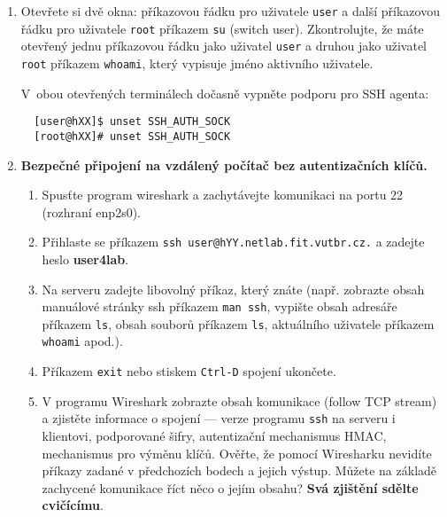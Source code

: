 \documentclass[a4paper,11pt]{article}
\begin{document}
\begin{enumerate}

  \item Otevřete si dvě okna: příkazovou řádku pro uživatele {\tt user} a další
    příkazovou řádku pro uživatele {\tt root} příkazem {\tt su} (switch user).
Zkontrolujte, že máte otevřený jednu příkazovou řádku jako uživatel
{\tt user} a druhou jako uživatel {\tt root} příkazem {\tt whoami}, který vypisuje jméno aktivního
uživatele.

    V~obou otevřených terminálech dočasně vypněte podporu pro SSH agenta:
  \begin{lstlisting}
  [user@hXX]$ unset SSH_AUTH_SOCK
  [root@hXX]# unset SSH_AUTH_SOCK
  \end{lstlisting}

  \item {\bf Bezpečné připojení na vzdálený počítač bez autentizačních klíčů.}

    \begin{enumerate}

      \item Spusťte program wireshark a zachytávejte komunikaci na portu 22
        (rozhraní enp2s0).

      \item Přihlaste se příkazem {\tt ssh user@hYY.netlab.fit.vutbr.cz.} a zadejte heslo \textbf{user4lab}.

      \item Na serveru zadejte libovolný příkaz, který znáte (např. zobrazte
        obsah manuálové stránky ssh příkazem {\tt man ssh}, vypište
        obsah adresáře příkazem {\tt ls}, obsah souborů příkazem {\tt ls},
        aktuálního uživatele příkazem {\tt whoami} apod.).

      \item Příkazem {\tt exit} nebo stiskem {\tt Ctrl-D} spojení ukončete.

      \item V programu Wireshark zobrazte obsah komunikace (follow TCP stream) a
        zjistěte informace o spojení --- verze programu {\tt ssh} na serveru i
        klientovi, podporované šifry, autentizační mechanismus HMAC, mechanismus
        pro výměnu klíčů. Ověřte, že pomocí Wiresharku nevidíte příkazy zadané v
        předchozích bodech a jejich výstup. Můžete na základě zachycené
        komunikace říct něco o jejím obsahu? {\bf Svá zjištění sdělte cvičícímu}.

    \end{enumerate}


\end{enumerate}
\end{document}
